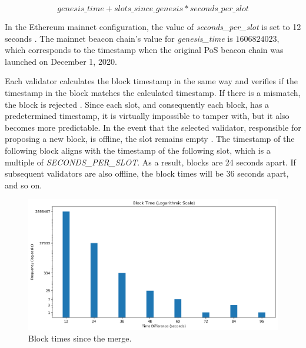 \begin{equation}
genesis\_time + slots\_since\_genesis *
seconds\_per\_slot
\end{equation}


In the Ethereum mainnet configuration, the value of \textit{seconds\_per\_slot} is set to
12 seconds \cite{seconds-per-slot-mainnet} \cite{seconds-per-slot-mainnet-doc}.
The mainnet beacon chain's value for \textit{genesis\_time} is $1606824023$, which
corresponds to the timestamp when the original PoS beacon chain was launched on
December 1, 2020.

Each validator calculates the block timestamp in the same way and verifies if
the timestamp in the block matches the calculated timestamp. If there is a
mismatch, the block is rejected \cite{process-execution-payload}. Since each
slot, and consequently each block, has a predetermined timestamp, it is
virtually impossible to tamper with, but it also becomes more predictable. In
the event that the selected validator, responsible for proposing a new block,
is offline, the slot remains empty \cite{validator-offline}. The timestamp of
the following block aligns with the timestamp of the following slot, which is a
multiple of \textit{SECONDS\_PER\_SLOT}. As a result, blocks are 24 seconds
apart. If subsequent validators are also offline, the block times will be 36
seconds apart, and so on.


\begin{figure}[H]
  \centering
  \includegraphics[width=1\textwidth]{../block_time_analysis/time_difference_bar.png}
  \caption{Block times since the merge.}
  \label{fig:block_time_analysis}
\end{figure}

